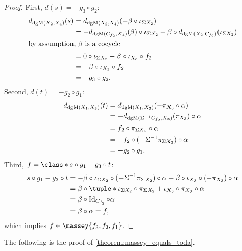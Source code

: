 \begin{proof}
    First, \( d(s) = -g_3 \circ g_2 \):
    \begin{align*}
        d_{\operatorname{dgM}(X_2, X_4)}(s) &= d_{\operatorname{dgM}(X_2, X_4)}(- \beta \circ \iota_{\Sigma X_2}) \\
        &= - d_{\operatorname{dgM}(C_{f_2}, X_4)}(\beta) \circ \iota_{\Sigma X_2} - \beta \circ d_{\operatorname{dgM}(X_2, C_{f_2})}(\iota_{\Sigma X_2}) \\
        \intertext{by assumption, \( \beta \) is a cocycle}
        &= 0 \circ \iota_{\Sigma X_2} - \beta \circ \iota_{X_3} \circ f_2 \\
        &= - \beta \circ \iota_{X_3} \circ f_2 \\
        &= - g_3 \circ g_2.
    \end{align*}
    Second, \( d(t) = - g_2 \circ g_1 \):
    \begin{align*}
         d_{\operatorname{dgM}(X_1, X_3)}(t) &= d_{\operatorname{dgM}(X_1, X_3)}(- \pi_{X_3} \circ \alpha) \\
         &= -d_{\operatorname{dgM}(\Sigma^{-1} C_{f_2}, X_3)}(\pi_{X_3}) \circ \alpha \\
         &= f_2 \circ \pi_{\Sigma X_2} \circ \alpha \\
         &= - f_2 \circ (- \Sigma^{-1} \pi_{\Sigma X_2}) \circ \alpha \\
         &= - g_2 \circ g_1.
    \end{align*}
    Third, \( f = \class*{s \circ g_1 - g_3 \circ t} \):
    \begin{align*}
        s \circ g_1 - g_3 \circ t &= - \beta \circ \iota_{\Sigma X_2} \circ (-\Sigma^{-1} \pi_{\Sigma X_2}) \circ \alpha - \beta \circ \iota_{X_3} \circ (- \pi_{X_3}) \circ \alpha \\
        &= \beta \circ \tuple*{\iota_{\Sigma X_2} \circ \pi_{\Sigma X_2} + \iota_{X_3} \circ \pi_{X_3}} \circ \alpha \\
        &= \beta \circ \Id_{C_{f_2}} \circ \alpha \\
        &= \beta \circ \alpha = f,
    \end{align*}
    which implies \( f \in \massey{f_3, f_2, f_1} \).
\end{proof}

The following is the proof of \autoref{theorem:massey_equals_toda}.

